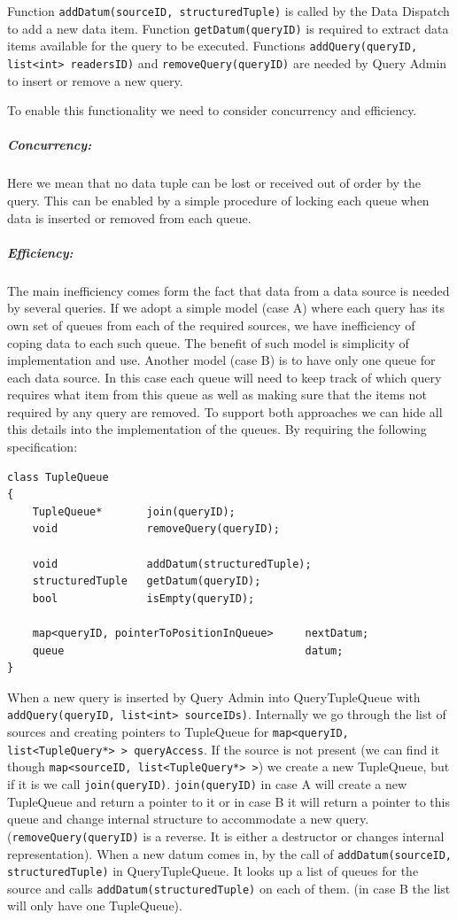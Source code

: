 \documentclass[11pt]{article}
\begin{document}
\noindent Function {\tt addDatum(sourceID, structuredTuple)} is called by the Data Dispatch to add a new data item. Function {\tt getDatum(queryID)} is required to extract data items available for the query to be executed. Functions {\tt addQuery(queryID, list<int> readersID)} and {\tt removeQuery(queryID)} are needed by Query Admin to insert or remove a new query. 

To enable this functionality we need to consider concurrency and efficiency. 

\subparagraph{Concurrency:} Here we mean that no data tuple can be lost or received out of order by the query. This can be enabled by a simple procedure of locking each queue when data is inserted or removed from each queue.

\subparagraph{Efficiency:} The main inefficiency comes form the fact that data from a data source is needed by several queries. If we adopt a simple model (case A) where each query has its own set of queues from each of the required sources, we have inefficiency of coping data to each such queue. The benefit of such model is simplicity of implementation and use. Another model (case B) is to have only one queue for each data source. In this case each queue will need to keep track of which query requires what item from this queue as well as making sure that the items not required by any query are removed. To support both approaches we can hide all this details into the implementation of the queues. By requiring the following specification:

\begin{verbatim}
class TupleQueue
{
	TupleQueue*       join(queryID);
	void              removeQuery(queryID);
	
	void              addDatum(structuredTuple);
	structuredTuple   getDatum(queryID);
	bool              isEmpty(queryID);
	
	map<queryID, pointerToPositionInQueue>     nextDatum;
	queue                                      datum;
}
\end{verbatim}

When a new query is inserted by Query Admin into QueryTupleQueue with {\tt addQuery(queryID, list<int> sourceIDs)}. Internally we go through the list of sources and creating pointers to TupleQueue for {\tt map<queryID, list<TupleQuery*> >   queryAccess}. If the source is not present (we can find it though {\tt map<sourceID, list<TupleQuery*> >}) we create a new TupleQueue, but if it is we call {\tt join(queryID)}. {\tt join(queryID)} in case A will create a new TupleQueue and return a pointer to it or in case B it will return a pointer to this queue and change internal structure to accommodate a new query. ({\tt removeQuery(queryID)} is a reverse. It is either a destructor or changes internal representation). When a new datum comes in, by the call of {\tt addDatum(sourceID, structuredTuple)} in QueryTupleQueue. It looks up a list of queues for the source and calls {\tt addDatum(structuredTuple)} on each of them. (in case B the list will only have one TupleQueue).
\end{document}
